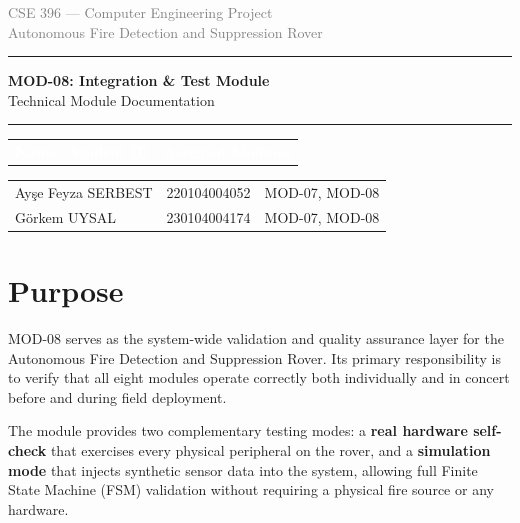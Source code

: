 \documentclass[a4paper,11pt]{article}
\newcommand{\theadtext}[1]{\textcolor{white}{\textbf{#1}}}
\begin{document}
\textcolor{gray}{\small CSE 396 --- Computer Engineering Project}\\
\textcolor{gray}{\small Autonomous Fire Detection and Suppression Rover}

\vspace{8pt}
{\color{accent}\rule{\linewidth}{2pt}}
\vspace{6pt}

{\LARGE\bfseries\color{accent} MOD-08: Integration \& Test Module}\\[4pt]
{\large Technical Module Documentation}

\vspace{4pt}
{\color{gray}\rule{\linewidth}{0.5pt}}
\vspace{10pt}

\begin{tabular}{
  >{}L{6.46cm}
  >{}L{4.25cm}
  >{}L{5.3cm}
}
\theadtext{Name} & \theadtext{Student ID} & \theadtext{Assigned Modules} \\
\end{tabular}

\vspace{0pt}
\begin{tabular}{L{6.46cm} L{4.25cm} L{5.3cm}}
   Ayşe Feyza SERBEST & 220104004052 & MOD-07, MOD-08 \\
 Görkem UYSAL        & 230104004174 & MOD-07, MOD-08 \\
\end{tabular}

\vspace{16pt}

\section{Purpose}

MOD-08 serves as the system-wide validation and quality assurance layer for the Autonomous
Fire Detection and Suppression Rover. Its primary responsibility is to verify that all
eight modules operate correctly both individually and in concert before and during field
deployment.

The module provides two complementary testing modes: a \textbf{real hardware self-check}
that exercises every physical peripheral on the rover, and a \textbf{simulation mode} that
injects synthetic sensor data into the system, allowing full Finite State Machine (FSM)
validation without requiring a physical fire source or any hardware.
\end{document}
